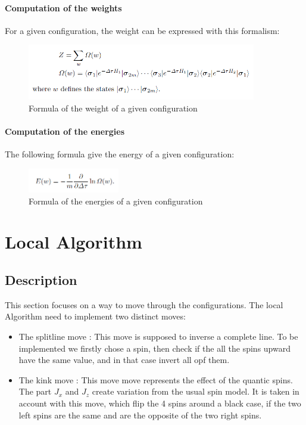 \documentclass[a4paper,12pt,twoside]{article}
\begin{document}
	\paragraph{Computation of the weights} For a given configuration, the weight can be expressed with this formalism:
	\begin{figure}[!h]
		\centering
		\includegraphics[width=10cm]{weights.png}
		\caption{Formula of the weight of a given configuration}
	\end{figure} 

	\paragraph{Computation of the energies} The following formula give the energy of a given configuration:
	\begin{figure}[!h]
		\centering
		\includegraphics[width=4cm]{energies.png}
		\caption{Formula of the energies of a given configuration}
	\end{figure} 
	
	\newpage
	\section{Local Algorithm}
	\subsection{Description}

		
	 This section focuses on a way to move through the configurations.
	 The local Algorithm need to implement two distinct moves:
	 
	 \begin{itemize}[label=$\star$]
	 	\item{The splitline move :} This move is supposed to inverse a complete line. To be implemented we firstly chose a spin, then check if the all the spins upward have the same value, and in that case invert all opf them.
	 	
	 	\item{The kink move :} This move move represents the effect of the quantic spins. The part $J_x$ and $J_z$ create variation from the usual spin model. It is taken in account with this move, which flip the 4 spins around a black case, if the two left spins are the same and are the opposite of the two right spins.
	 \end{itemize}
		 	
\end{document}
